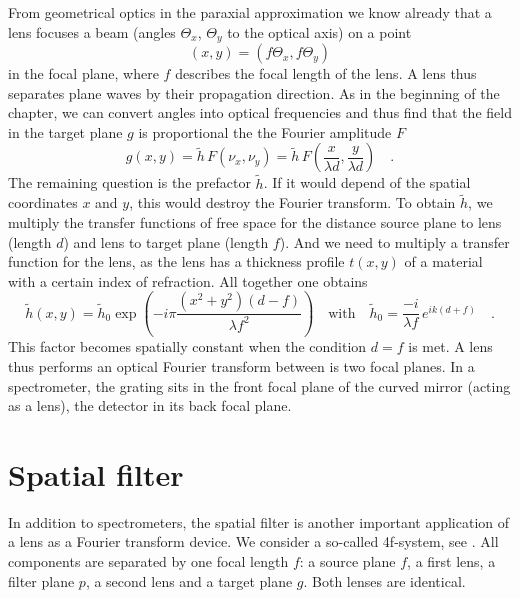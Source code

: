 From geometrical optics in the paraxial approximation we know already that a lens focuses a beam  (angles $\Theta_x$, $\Theta_y$ to the optical axis) on a point 
\begin{equation}
(x,y) = (f \Theta_x, f \Theta_y)
\end{equation}
in the focal plane, where $f$ describes the focal length of the lens. A lens thus separates plane waves by their propagation direction. As in the beginning of the chapter, we can convert angles into optical frequencies and thus find that the field in the target plane $g$ is proportional the the Fourier amplitude $F$
\begin{equation}
    g(x,y) = \tilde{h} \,   F \left( \nu_x,\nu_y \right) = \tilde{h} \,  F \left( \frac{x}{\lambda d}, \frac{y}{\lambda d} \right) \quad .
\end{equation}
The remaining question is the prefactor $\tilde{h}$. If it would depend of the spatial coordinates $x$ and $y$, this would destroy the Fourier transform. To obtain $\tilde{h}$, we multiply the transfer functions of free space for the distance source plane to lens (length $d$) and lens to target plane (length $f$). And we need to multiply a transfer function for the lens, as the lens has a thickness profile $t(x,y)$ of a material with a certain index of refraction. All together one obtains
\begin{equation}
    \tilde{h}(x,y) =  \tilde{h}_0 \exp \left( 
- i \pi \frac{(x^2 + y^2)(d-f)}{\lambda f^2}
    \right) \quad \text{with} \quad  \tilde{h}_0  = \frac{-i}{\lambda f} \, e^{ik (d+f)} \quad .
\end{equation}
This factor becomes spatially constant when the condition $d=f$ is met. A lens thus performs an optical Fourier transform between is two focal planes. In a spectrometer, the grating sits in the front focal plane of the curved mirror (acting as a lens), the detector in its back focal plane.




\section{Spatial filter}


In addition to spectrometers, the spatial filter is another important application of a lens as a Fourier transform device. We consider a so-called 4f-system, see \cite{SalehTeich1991}. All components are separated by one focal length $f$: a source plane $f$, a first lens, a filter plane $p$, a second lens and a target plane $g$. Both lenses are identical. 

